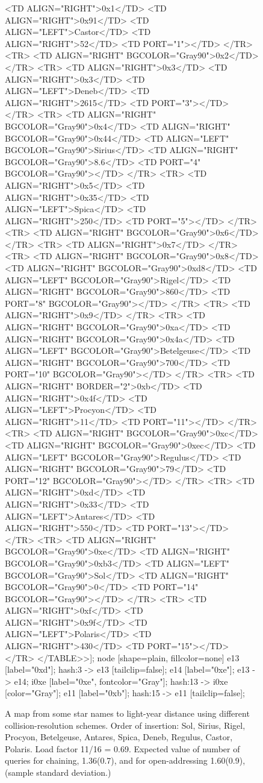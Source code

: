 \documentclass[12pt]{article}
\begin{document}
\begin{figure}
{{		<TD ALIGN="RIGHT">0x1</TD>
		<TD ALIGN="RIGHT">0x91</TD>
		<TD ALIGN="LEFT">Castor</TD>
		<TD ALIGN="RIGHT">52</TD>
		<TD PORT="1">
	</TR>
	<TR>
		<TD ALIGN="RIGHT" BGCOLOR="Gray90">0x2</TD>
	</TR>
	<TR>
		<TD ALIGN="RIGHT">0x3</TD>
		<TD ALIGN="RIGHT">0x3</TD>
		<TD ALIGN="LEFT">Deneb</TD>
		<TD ALIGN="RIGHT">2615</TD>
		<TD PORT="3">
	</TR>
	<TR>
		<TD ALIGN="RIGHT" BGCOLOR="Gray90">0x4</TD>
		<TD ALIGN="RIGHT" BGCOLOR="Gray90">0x44</TD>
		<TD ALIGN="LEFT" BGCOLOR="Gray90">Sirius</TD>
		<TD ALIGN="RIGHT" BGCOLOR="Gray90">8.6</TD>
		<TD PORT="4" BGCOLOR="Gray90">
	</TR>
	<TR>
		<TD ALIGN="RIGHT">0x5</TD>
		<TD ALIGN="RIGHT">0x35</TD>
		<TD ALIGN="LEFT">Spica</TD>
		<TD ALIGN="RIGHT">250</TD>
		<TD PORT="5">
	</TR>
	<TR>
		<TD ALIGN="RIGHT" BGCOLOR="Gray90">0x6</TD>
	</TR>
	<TR>
		<TD ALIGN="RIGHT">0x7</TD>
	</TR>
	<TR>
		<TD ALIGN="RIGHT" BGCOLOR="Gray90">0x8</TD>
		<TD ALIGN="RIGHT" BGCOLOR="Gray90">0xd8</TD>
		<TD ALIGN="LEFT" BGCOLOR="Gray90">Rigel</TD>
		<TD ALIGN="RIGHT" BGCOLOR="Gray90">860</TD>
		<TD PORT="8" BGCOLOR="Gray90">
	</TR>
	<TR>
		<TD ALIGN="RIGHT">0x9</TD>
	</TR>
	<TR>
		<TD ALIGN="RIGHT" BGCOLOR="Gray90">0xa</TD>
		<TD ALIGN="RIGHT" BGCOLOR="Gray90">0x4a</TD>
		<TD ALIGN="LEFT" BGCOLOR="Gray90">Betelgeuse</TD>
		<TD ALIGN="RIGHT" BGCOLOR="Gray90">700</TD>
		<TD PORT="10" BGCOLOR="Gray90">
	</TR>
	<TR>
		<TD ALIGN="RIGHT" BORDER="2">0xb</TD>
		<TD ALIGN="RIGHT">0x4f</TD>
		<TD ALIGN="LEFT">Procyon</TD>
		<TD ALIGN="RIGHT">11</TD>
		<TD PORT="11">
	</TR>
	<TR>
		<TD ALIGN="RIGHT" BGCOLOR="Gray90">0xc</TD>
		<TD ALIGN="RIGHT" BGCOLOR="Gray90">0xec</TD>
		<TD ALIGN="LEFT" BGCOLOR="Gray90">Regulus</TD>
		<TD ALIGN="RIGHT" BGCOLOR="Gray90">79</TD>
		<TD PORT="12" BGCOLOR="Gray90">
	</TR>
	<TR>
		<TD ALIGN="RIGHT">0xd</TD>
		<TD ALIGN="RIGHT">0x33</TD>
		<TD ALIGN="LEFT">Antares</TD>
		<TD ALIGN="RIGHT">550</TD>
		<TD PORT="13">
	</TR>
	<TR>
		<TD ALIGN="RIGHT" BGCOLOR="Gray90">0xe</TD>
		<TD ALIGN="RIGHT" BGCOLOR="Gray90">0xb3</TD>
		<TD ALIGN="LEFT" BGCOLOR="Gray90">Sol</TD>
		<TD ALIGN="RIGHT" BGCOLOR="Gray90">0</TD>
		<TD PORT="14" BGCOLOR="Gray90">
	</TR>
	<TR>
		<TD ALIGN="RIGHT">0xf</TD>
		<TD ALIGN="RIGHT">0x9f</TD>
		<TD ALIGN="LEFT">Polaris</TD>
		<TD ALIGN="RIGHT">430</TD>
		<TD PORT="15">
	</TR>
</TABLE>>];
	node [shape=plain, fillcolor=none]
	e13 [label="0xd"];
	hash:3 -> e13 [tailclip=false];
	e14 [label="0xe"];
	e13 -> e14;
	i0xe [label="0xe", fontcolor="Gray"];
	hash:13 -> i0xe [color="Gray"];
	e11 [label="0xb"];
	hash:15 -> e11 [tailclip=false];
		}
	}
	\caption{A map from some star names to light-year distance using different collision-resolution schemes. Order of insertion: Sol, Sirius, Rigel, Procyon, Betelgeuse, Antares, Spica, Deneb, Regulus, Castor, Polaris. Load factor 11/16 = 0.69. Expected value of number of queries for chaining, 1.36(0.7), and for open-addressing 1.60(0.9), (sample standard deviation.)\label{types}}
\end{figure}
\end{document}
